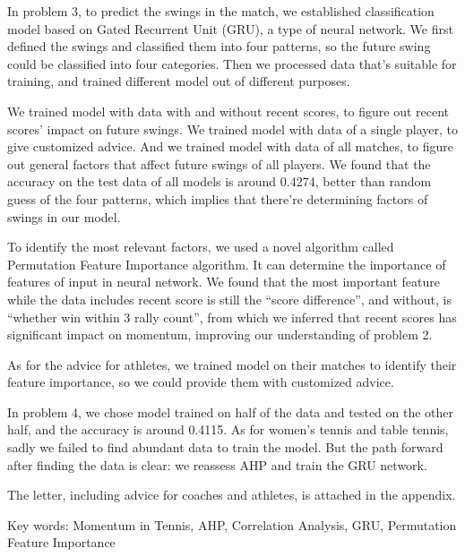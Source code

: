 In problem 3, to predict the swings in the match, we established classification model based on Gated Recurrent Unit (GRU),
a type of neural network.
We first defined the swings and classified them into four patterns, so the future swing could be classified into
four categories. Then we processed data that's suitable for training, and trained different model out of different purposes.

We trained model with data with and without recent scores, to figure out recent scores' impact on future swings.
We trained model with data of a single player, to give customized advice.
And we trained model with data of all matches, to figure out general factors that affect future swings of all players.
We found that the accuracy on the test data of all models is around 0.4274, better than random guess of the four patterns,
which implies that there're determining factors of swings in our model.

To identify the most relevant factors, we used a novel algorithm called Permutation Feature Importance algorithm.
It can determine the importance of features of input in neural network. We found that the most important feature while
the data includes recent score is still the ``score difference'', and without, is ``whether win within 3 rally count'',
from which we inferred that recent scores has significant impact on momentum,
improving our understanding of problem 2.

As for the advice for athletes, we trained model on their matches to identify their feature importance,
so we could provide them with customized advice.

In problem 4, we chose model trained on half of the data and tested on the other half, and the accuracy is around 0.4115.
As for women's tennis and table tennis, sadly we failed to find abundant data to train the model.
But the path forward after finding the data is clear: we reassess AHP and train the GRU network.

The letter, including advice for coaches and athletes, is attached in the appendix.

Key words: Momentum in Tennis, AHP, Correlation Analysis, GRU, Permutation Feature Importance